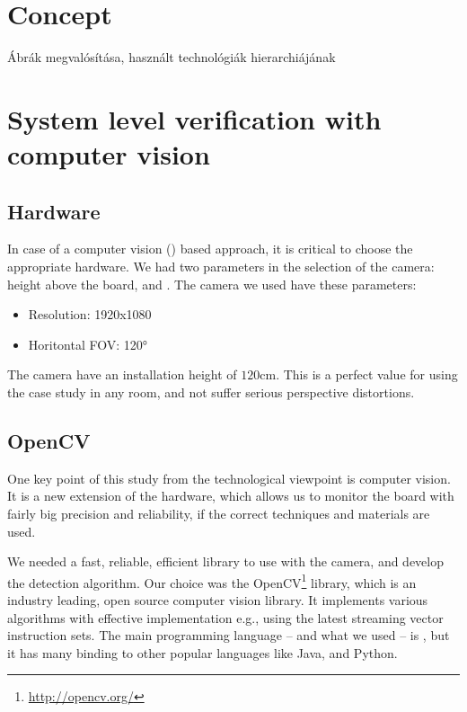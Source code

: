 \section{Concept}
	Ábrák megvalósítása, használt technológiák hierarchiájának

\section{System level verification with computer vision}

\subsection{Hardware}
\label{sec:case_study:hardware}

In case of a computer vision () based approach, it is critical to choose the appropriate hardware. We had two parameters in the selection of the camera: height above the board, and . The camera we used have these parameters:
\begin{itemize}
	\item Resolution: 1920x1080
	\item Horitontal FOV: \ang{120}
\end{itemize}

The camera have an installation height of $120$\si{\centi\meter}. This is a perfect value for using the case study in any room, and not suffer serious perspective distortions.

\subsection{OpenCV}

One key point of this study from the technological viewpoint is computer vision. It is a new extension of the hardware, which allows us to monitor the board with fairly big precision and reliability, if the correct techniques and materials are used.

We needed a fast, reliable, efficient library to use with the camera, and develop the detection algorithm. Our choice was the OpenCV\footnote{\url{http://opencv.org/}} library, which is an industry leading, open source computer vision library. It implements various algorithms with effective implementation e.g., using the latest streaming vector instruction sets. The main programming language -- and what we used -- is , but it has many binding to other popular languages like Java, and Python.

